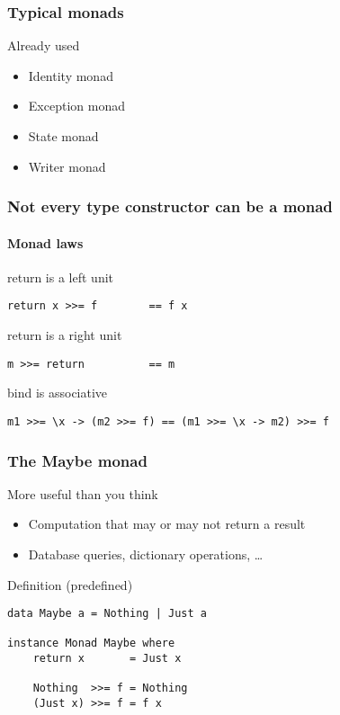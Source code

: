 \documentclass{beamer}
\begin{document}
\begin{frame}[fragile]
  \frametitle{Typical monads}
  \begin{block}{Already used}
  \begin{itemize}       
  \item Identity monad
  \item Exception monad
  \item State monad
  \item Writer monad
  \end{itemize} 
  \end{block}   
\end{frame}

\begin{frame}[fragile]
  \frametitle{Not every type constructor can be a monad}
  \framesubtitle{Monad laws}
  \begin{alertblock}{return is a left unit}
\begin{verbatim}
return x >>= f        == f x
\end{verbatim}
  \end{alertblock}
  \begin{alertblock}{return is a right unit}
\begin{verbatim}
m >>= return          == m
\end{verbatim}
  \end{alertblock}
  \begin{alertblock}{bind is associative}
\begin{verbatim}
m1 >>= \x -> (m2 >>= f) == (m1 >>= \x -> m2) >>= f
\end{verbatim}
  \end{alertblock}
\end{frame}

\begin{frame}[fragile]
  \frametitle{The Maybe monad}
  \begin{block}{More useful than you think}
                \begin{itemize}         
                        \item Computation that may or may not return a result
                        \item Database queries, dictionary operations, \dots
                \end{itemize}   
                \end{block}     
\pause
\begin{block}{Definition (predefined)}
\begin{verbatim}
data Maybe a = Nothing | Just a

instance Monad Maybe where
    return x       = Just x
    
    Nothing  >>= f = Nothing
    (Just x) >>= f = f x
\end{verbatim}  
\end{block}
\end{frame}             
\end{document}
